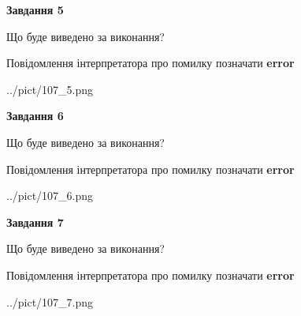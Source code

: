 \documentclass[10pt, ukrainian]{article}
\begin{document}
{\begin {large}
{\begin {center}\textbf{Завдання 5}\end {center}}\par
Що буде виведено за виконання? \par
Повідомлення інтерпретатора про помилку позначати \textbf{error}

\begin{center}
	{../pict/107_5.png}
\end{center}
\newpage

{\begin {center}\textbf{Завдання 6}\end {center}}\par
Що буде виведено за виконання? \par
Повідомлення інтерпретатора про помилку позначати \textbf{error}

\begin{center}
	{../pict/107_6.png}
\end{center}
\newpage

{\begin {center}\textbf{Завдання 7}\end {center}}\par
Що буде виведено за виконання? \par
Повідомлення інтерпретатора про помилку позначати \textbf{error}

\begin{center}
	{../pict/107_7.png}
\end{center}
\newpage

\end {large}}
\end{document}
